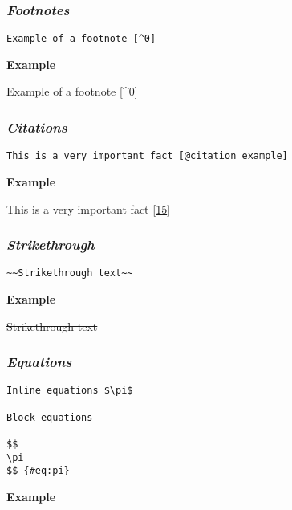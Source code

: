 \documentclass[journal,]{IEEEtran}
\begin{document}
\hypertarget{footnotes}{%
\subsubsection{\texorpdfstring{\textbf{\emph{Footnotes}}}{Footnotes}}\label{footnotes}}

\begin{verbatim}
Example of a footnote [^0]
\end{verbatim}

\textbf{Example}

Example of a footnote {[}\^{}0{]}

\hypertarget{citations}{%
\subsubsection{\texorpdfstring{\textbf{\emph{Citations}}}{Citations}}\label{citations}}

\begin{verbatim}
This is a very important fact [@citation_example]
\end{verbatim}

\textbf{Example}

This is a very important fact
{[}\protect\hyperlink{ref-citation_example}{15}{]}

\hypertarget{strikethrough}{%
\subsubsection{\texorpdfstring{\textbf{\emph{Strikethrough}}}{Strikethrough}}\label{strikethrough}}

\begin{verbatim}
~~Strikethrough text~~
\end{verbatim}

\textbf{Example}

\sout{Strikethrough text}

\hypertarget{equations}{%
\subsubsection{\texorpdfstring{\textbf{\emph{Equations}}}{Equations}}\label{equations}}

\begin{verbatim}
Inline equations $\pi$

Block equations

$$
\pi
$$ {#eq:pi}
\end{verbatim}

\textbf{Example}
\end{document}
